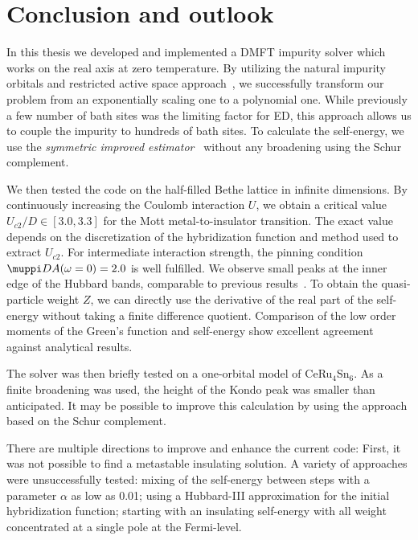 
\chapter{Conclusion and outlook}%
\label{ch:conclusion}

In this thesis we developed and implemented a DMFT impurity solver
which works on the real axis at zero temperature.
By utilizing the natural impurity orbitals
and restricted active space approach~\cite{Lu2014, Lu2019},
we successfully transform our problem from an exponentially scaling one to a polynomial one.
While previously a few number of bath sites was the limiting factor for ED,
this approach allows us to couple the impurity to hundreds of bath sites.
To calculate the self-energy, we use the \emph{symmetric improved estimator}~\cite{Kugler2022}
without any broadening using the Schur complement.

We then tested the code on the half-filled Bethe lattice in infinite dimensions.
By continuously increasing the Coulomb interaction $U$, we obtain a critical value
$U_{c2}/D \in [3.0, 3.3]$ for the Mott metal-to-insulator transition.
The exact value depends on the discretization of the hybridization function and method
used to extract $U_{c2}$.
For intermediate interaction strength,
the pinning condition $\muppi DA(\omega=0)=2.0$ is well fulfilled.
We observe small peaks at the inner edge
of the Hubbard bands, comparable to previous results~\cite{Karski2005, Karski2008, Ganahl2015}.
To obtain the quasi-particle weight $Z$, we can directly
use the derivative of the real part of the self-energy
without taking a finite difference quotient.
Comparison of the low order moments of the Green's function and self-energy
show excellent agreement against analytical results.

The solver was then briefly tested on a one-orbital model of CeRu$_4$Sn$_6$.
As a finite broadening was used, the height of the Kondo peak was smaller than anticipated.
It may be possible to improve this calculation by using the approach based on the Schur complement.

There are multiple directions to improve and enhance the current code:
First,
it was not possible to find a metastable insulating solution.
A variety of approaches were unsuccessfully tested: mixing of the self-energy between steps
with a parameter $\alpha$ as low as \num{0.01};
using a Hubbard-III approximation for the initial hybridization function;
starting with an insulating self-energy with all weight concentrated at a single pole
at the Fermi-level.

